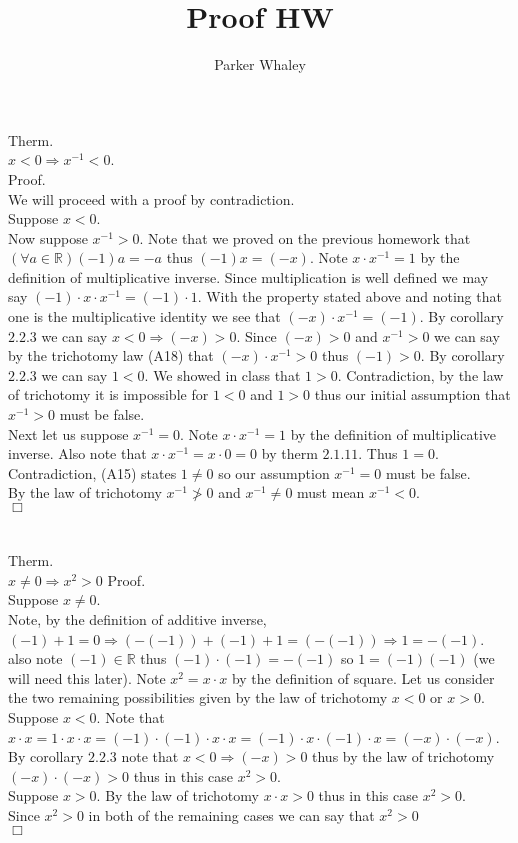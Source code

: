 \documentclass[12pt,a4paper]{article}
\author{Parker Whaley}
\title{Proof HW}
\begin{document}
\maketitle
\section{}
Therm.\\
$x<0\Rightarrow x^{-1}<0$.\\
Proof.\\
We will proceed with a proof by contradiction.\\
Suppose $x<0$.\\
Now suppose $x^{-1}>0$.  Note that we proved on the previous homework that $(\forall a \in \mathbb{R})(-1)a=-a$ thus $(-1)x=(-x)$.  Note $x\cdot x^{-1}=1$ by the definition of multiplicative inverse.  Since multiplication is well defined we may say $(-1)\cdot x\cdot x^{-1}=(-1)\cdot 1$.  With the property stated above and noting that one is the multiplicative identity we see that $(-x)\cdot x^{-1}=(-1)$.  By corollary $2.2.3$ we can say $x<0\Rightarrow (-x)>0$.  Since $(-x)>0$ and $x^{-1}>0$ we can say by the trichotomy law (A18) that $(-x)\cdot x^{-1}>0$ thus $(-1)>0$.  By corollary $2.2.3$ we can say $1<0$.  We showed in class that $1>0$.  Contradiction, by the law of trichotomy it is impossible for $1<0$ and $1>0$ thus our initial assumption that $x^{-1}>0$ must be false.\\
Next let us suppose $x^{-1}=0$.  Note $x\cdot x^{-1}=1$ by the definition of multiplicative inverse.  Also note that $x\cdot x^{-1}=x\cdot 0=0$ by therm $2.1.11$.  Thus $1=0$.  Contradiction, (A15) states $1\neq 0$ so our assumption $x^{-1}=0$ must be false.\\
By the law of trichotomy $x^{-1}\ngtr 0$ and $x^{-1}\neq 0$ must mean $x^{-1}<0$.\\$\Box$

\section{}
Therm.\\
$x\neq 0\Rightarrow x^2>0$
Proof.\\
Suppose $x\neq 0$.\\
Note, by the definition of additive inverse, $(-1)+1=0\Rightarrow (-(-1))+(-1)+1=(-(-1))\Rightarrow 1=-(-1)$.   also note $(-1)\in \mathbb{R}$ thus $(-1)\cdot (-1)=-(-1)$ so $1=(-1)(-1)$ (we will need this later).  Note $x^2=x\cdot x$ by the definition of square.  Let us consider the two remaining possibilities given by the law of trichotomy $x<0$ or $x>0$.\\
Suppose $x<0$.  Note that $x\cdot x=1\cdot x\cdot x=(-1)\cdot (-1) \cdot x\cdot x=(-1) \cdot x\cdot (-1) \cdot x=(-x)\cdot (-x)$.  By corollary $2.2.3$ note that $x<0\Rightarrow (-x)>0$ thus by the law of trichotomy $(-x)\cdot (-x)>0$ thus in this case $x^2>0$.\\
Suppose $x>0$.  By the law of trichotomy $x\cdot x>0$ thus in this case $x^2>0$.\\
Since $x^2>0$ in both of the remaining cases we can say that $x^2>0$\\$\Box$
\end{document}
